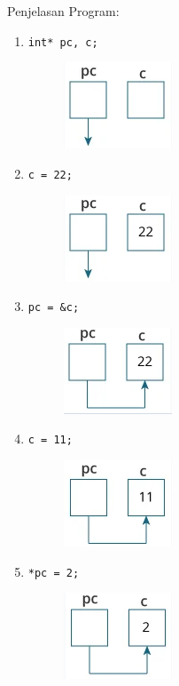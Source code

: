 Penjelasan Program:\\
\begin{enumerate}
    \item \verb|int* pc, c;|
          \begin{figure}[H]
              \centering
              \includegraphics[width=0.2\linewidth]{P4/img/screenshot001.png}
              \caption{}
              \label{fig:satu}
          \end{figure}
    \item \verb|c = 22;|
          \begin{figure}[H]
              \centering
              \includegraphics[width=0.2\linewidth]{P4/img/screenshot002.png}
              \caption{}
              \label{fig:dua}
          \end{figure}
    \item \verb|pc = &c;|
          \begin{figure}[H]
              \centering
              \includegraphics[width=0.2\linewidth]{P4/img/screenshot003.png}
              \caption{}
              \label{fig:tiga}
          \end{figure}
    \item \verb|c = 11;|
          \begin{figure}[H]
              \centering
              \includegraphics[width=0.2\linewidth]{P4/img/screenshot004.png}
              \caption{}
              \label{fig:empat}
          \end{figure}
    \item \verb|*pc = 2;|
          \begin{figure}[H]
              \centering
              \includegraphics[width=0.2\linewidth]{P4/img/screenshot005.png}
              \caption{}
              \label{fig:lima}
          \end{figure}
\end{enumerate}

